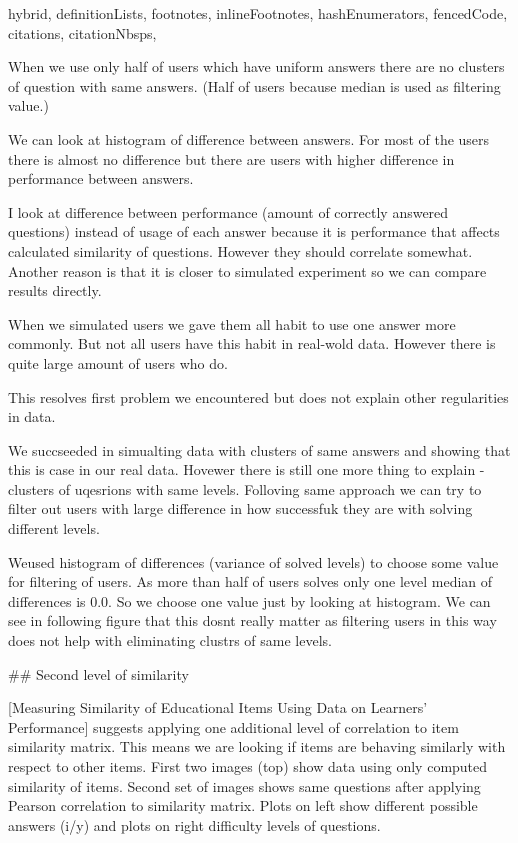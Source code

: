 \documentclass[
  digital, %
  table,   %
  nolof,     %
  nolot,     %
  nocover
]{fithesis3}
\begin{document}
\begin{markdown*}{%
  hybrid,
  definitionLists,
  footnotes,
  inlineFootnotes,
  hashEnumerators,
  fencedCode,
  citations,
  citationNbsps,
}

When we use only half of users which have uniform answers there are no clusters of question with same answers. (Half of users because median is used as filtering value.)

We can look at histogram of difference between answers. For most of the users there is almost no difference but there are users with higher difference in performance between answers.


I look at difference between performance (amount of correctly answered questions) instead of usage of each answer because it is performance that affects calculated similarity of questions. However they should correlate somewhat. Another reason is that it is closer to simulated experiment so we can compare results directly.

When we simulated users we gave them all habit to use one answer more commonly. But not all users have this habit in real-wold data. However there is quite large amount of users who do.

This resolves first problem we encountered but does not explain other regularities in data.

We succseeded in simualting data with clusters of same answers and showing that this is case in our real data. Hovewer there is still one more thing to explain - clusters of uqesrions with same levels. Folloving same approach we can try to filter out users with large difference in how successfuk they are with solving different levels.

Weused histogram of differences (variance of solved levels) to choose some value for filtering of users. As more than half of users solves only one level median of differences is 0.0. So we choose one value just by looking at histogram. We can see in following figure that this dosnt really matter as filtering users in this way does not help with eliminating clustrs of same levels.


## Second level of similarity

[Measuring Similarity of Educational Items Using Data on Learners’ Performance] suggests applying one additional level of correlation to item similarity matrix. This means we are looking if items are behaving similarly with respect to other items. First two images (top) show data using only computed similarity of items. Second set of images shows same questions after applying Pearson correlation to similarity matrix. Plots on left show different possible answers (i/y) and plots on right difficulty levels of questions.


\end{markdown*}
\end{document}
